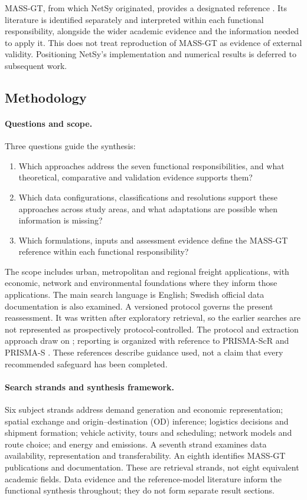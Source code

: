 MASS-GT, from which NetSy originated, provides a designated reference
\parencite{massgt2018,massgt2025}. Its literature is identified separately and
interpreted within each functional responsibility, alongside the wider academic
evidence and the information needed to apply it. This does not treat
reproduction of MASS-GT as evidence of external validity. Positioning NetSy's
implementation and numerical results is deferred to subsequent work.

\subsection{Methodology}\label{sec:slr-methodology}
\paragraph{Questions and scope.}
Three questions guide the synthesis:
\begin{enumerate}
\item Which approaches address the seven functional responsibilities, and what theoretical,
comparative and validation evidence supports them?
\item Which data configurations, classifications and resolutions support these
approaches across study areas, and what adaptations are possible when
information is missing?
\item Which formulations, inputs and assessment evidence define the MASS-GT
reference within each functional responsibility?
\end{enumerate}
The scope includes urban, metropolitan and regional freight applications,
with economic, network and environmental foundations where they inform those
applications. The main search language is English; Swedish official data
documentation is also examined. A versioned protocol governs the present
reassessment. It was written after exploratory retrieval, so the earlier
searches are not represented as prospectively protocol-controlled. The protocol
and extraction approach draw on \textcite{kitchenham2007}; reporting is organized
with reference to PRISMA-ScR and PRISMA-S
\parencite{prismascr2018,prismas2021}. These references describe guidance used,
not a claim that every recommended safeguard has been completed.

\paragraph{Search strands and synthesis framework.}\label{sec:review-framework}
Six subject strands address demand generation and economic representation;
spatial exchange and origin--destination (OD) inference; logistics decisions and
shipment formation; vehicle activity, tours and scheduling; network models and
route choice; and energy and emissions. A seventh strand examines data
availability, representation and transferability. An eighth identifies MASS-GT
publications and documentation. These are retrieval strands, not eight equivalent
academic fields. Data evidence and the reference-model literature inform the
functional synthesis throughout; they do not form separate result sections.

